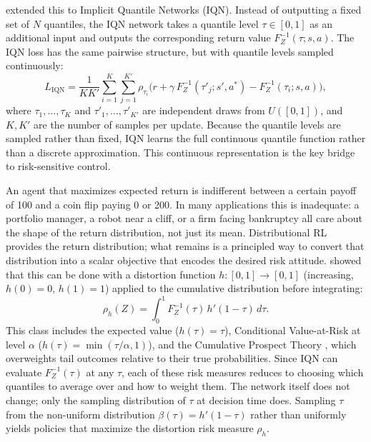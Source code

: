 \citet{Dabney2018b} extended this to Implicit Quantile Networks (IQN).
Instead of outputting a fixed set of $N$ quantiles, the IQN network takes
a quantile level $\tau \in [0,1]$ as an additional input and outputs the
corresponding return value $F_{Z}^{-1}(\tau; s,a)$. The IQN loss has
the same pairwise structure, but with quantile levels sampled
continuously:
\begin{equation}
  L_{\text{IQN}} = \frac{1}{KK'} \sum_{i=1}^{K} \sum_{j=1}^{K'}
  \rho_{\tau_i}\bigl(
    r + \gamma\, F_{Z}^{-1}(\tau'_j; s', a^*)
    - F_{Z}^{-1}(\tau_i; s, a)
  \bigr),
  \label{eq:iqn_loss}
\end{equation}
where $\tau_1, \ldots, \tau_K$ and $\tau'_1, \ldots, \tau'_{K'}$ are
independent draws from $U([0,1])$, and $K, K'$ are the number of
samples per update. Because the quantile levels are sampled rather than
fixed, IQN learns the full continuous quantile function rather than a
discrete approximation. This continuous representation is the key bridge
to risk-sensitive control.

An agent that maximizes expected return is indifferent between a certain
payoff of 100 and a coin flip paying 0 or 200. In many applications this
is inadequate: a portfolio manager, a robot near a cliff, or a firm
facing bankruptcy all care about the shape of the return distribution, not
just its mean. Distributional RL provides the return distribution; what
remains is a principled way to convert that distribution into a scalar
objective that encodes the desired risk attitude. \citet{Yaari1987}
showed that this can be done with a distortion function
$h: [0,1] \to [0,1]$ (increasing, $h(0)=0$, $h(1)=1$) applied to the
cumulative distribution before integrating:
\begin{equation}
  \rho_h(Z) = \int_0^1 F_Z^{-1}(\tau) \, h'(1-\tau) \, d\tau.
  \label{eq:distortion_risk}
\end{equation}
This class includes the expected value ($h(\tau)=\tau$), Conditional
Value-at-Risk at level $\alpha$ ($h(\tau) = \min(\tau/\alpha, 1)$), and the
Cumulative Prospect Theory
\citep{TverskyKahneman1992}, which overweights tail outcomes relative to
their true probabilities. Since IQN can evaluate $F_Z^{-1}(\tau)$ at
any $\tau$, each of these risk measures reduces to choosing which quantiles
to average over and how to weight them. The network itself does not change;
only the sampling distribution of $\tau$ at decision time does. Sampling
$\tau$ from the non-uniform distribution $\beta(\tau) = h'(1-\tau)$ rather
than uniformly yields policies that maximize the distortion risk measure
$\rho_h$.

